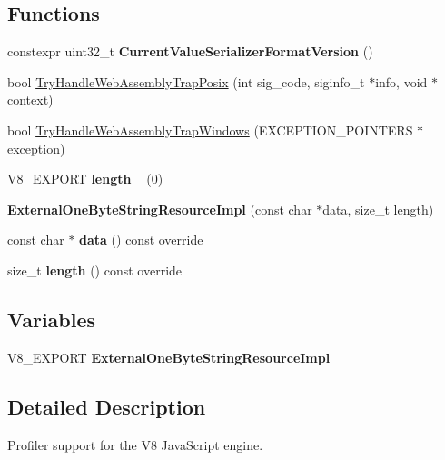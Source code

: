 \subsection*{Functions}
\begin{DoxyCompactItemize}
\item 
\mbox{\label{namespacev8_ad313789859cb91887fa3f85d2339827f}} 
constexpr uint32\+\_\+t {\bfseries Current\+Value\+Serializer\+Format\+Version} ()
\item 
bool \mbox{\hyperlink{namespacev8_a801e3a2af23e3fdef8b4a728bccbcccf}{Try\+Handle\+Web\+Assembly\+Trap\+Posix}} (int sig\+\_\+code, siginfo\+\_\+t $\ast$info, void $\ast$context)
\item 
bool \mbox{\hyperlink{namespacev8_a3686a31962558f552b86653f59e774dd}{Try\+Handle\+Web\+Assembly\+Trap\+Windows}} (E\+X\+C\+E\+P\+T\+I\+O\+N\+\_\+\+P\+O\+I\+N\+T\+E\+RS $\ast$exception)
\item 
\mbox{\label{namespacev8_a3316a460f8c1b1c26ef1502672a45d82}} 
V8\+\_\+\+E\+X\+P\+O\+RT {\bfseries length\+\_\+} (0)
\item 
\mbox{\label{namespacev8_a4dbc856eb5646ff38552425289662910}} 
{\bfseries External\+One\+Byte\+String\+Resource\+Impl} (const char $\ast$data, size\+\_\+t length)
\item 
\mbox{\label{namespacev8_a986ddc1d3d9ae9f1dbd856769c69af09}} 
const char $\ast$ {\bfseries data} () const override
\item 
\mbox{\label{namespacev8_aefdae7ce6c1c58d9a7b6a55a498ca134}} 
size\+\_\+t {\bfseries length} () const override
\end{DoxyCompactItemize}
\subsection*{Variables}
\begin{DoxyCompactItemize}
\item 
\mbox{\label{namespacev8_a334d0c3d287d168d13b385852d2ba541}} 
V8\+\_\+\+E\+X\+P\+O\+RT {\bfseries External\+One\+Byte\+String\+Resource\+Impl}
\end{DoxyCompactItemize}


\subsection{Detailed Description}
Profiler support for the V8 Java\+Script engine.

